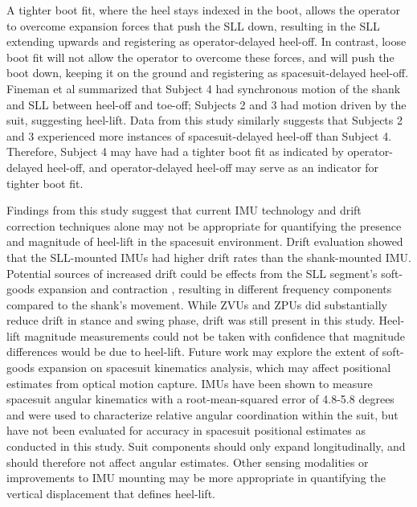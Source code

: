 \documentclass[defaultstyle,11pt]{comps}
\begin{document}
A tighter boot fit, where the heel stays indexed in the boot, allows the operator to overcome expansion forces that push the SLL down, resulting in the SLL extending upwards and registering as operator-delayed heel-off.
In contrast, loose boot fit will not allow the operator to overcome these forces, and will push the boot down, keeping it on the ground and registering as spacesuit-delayed heel-off.
Fineman et al \citep{Fineman2018} summarized that Subject 4 had synchronous motion of the shank and SLL between heel-off and toe-off; Subjects 2 and 3 had motion driven by the suit, suggesting heel-lift.
Data from this study similarly suggests that Subjects 2 and 3 experienced more instances of spacesuit-delayed heel-off than Subject 4.
Therefore, Subject 4 may have had a tighter boot fit as indicated by operator-delayed heel-off, and operator-delayed heel-off may serve as an indicator for tighter boot fit.

Findings from this study suggest that current IMU technology and drift correction techniques alone may not be appropriate for quantifying the presence and magnitude of heel-lift in the spacesuit environment.
Drift evaluation showed that the SLL-mounted IMUs had higher drift rates than the shank-mounted IMU.
Potential sources of increased drift could be effects from the SLL segment's soft-goods expansion and contraction \citep{Fineman2018, Harris2001}, resulting in different frequency components compared to the shank's movement.
While ZVUs and ZPUs did substantially reduce drift in stance and swing phase, drift was still present in this study.
Heel-lift magnitude measurements could not be taken with confidence that magnitude differences would be due to heel-lift.
Future work may explore the extent of soft-goods expansion on spacesuit kinematics analysis, which may affect positional estimates from optical motion capture.
IMUs have been shown to measure spacesuit angular kinematics with a root-mean-squared error of 4.8-5.8 degrees\citep{Bertrand2014} and were used to characterize relative angular coordination within the suit\citep{Fineman2018}, but have not been evaluated for accuracy in spacesuit positional estimates as conducted in this study.
Suit components should only expand longitudinally, and should therefore not affect angular estimates\citep{Harris2001}.
Other sensing modalities or improvements to IMU mounting may be more appropriate in quantifying the vertical displacement that defines heel-lift.
\end{document}
